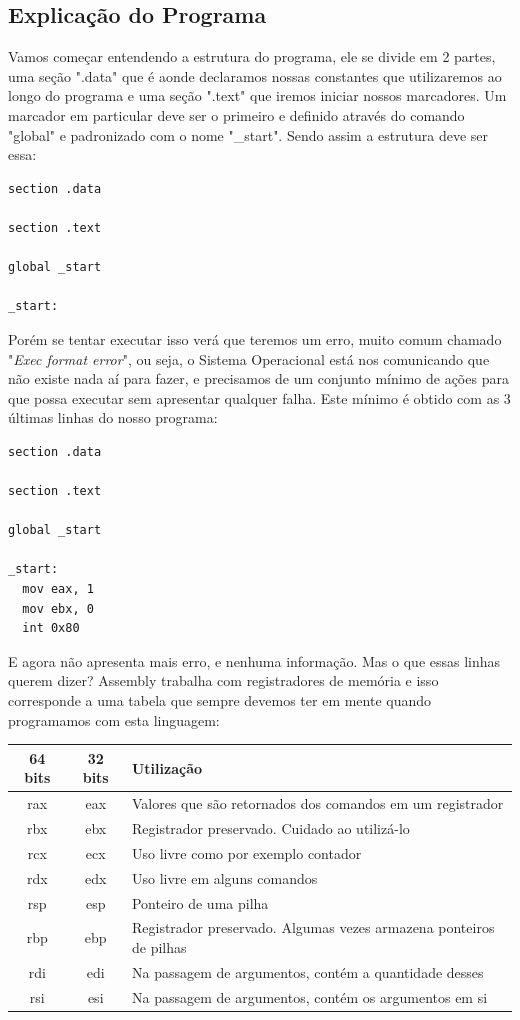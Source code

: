 \subsection{Explicação do Programa}

Vamos começar entendendo a estrutura do programa, ele se divide em 2 partes, uma seção ".data" que é aonde declaramos nossas constantes que utilizaremos ao longo do programa e uma seção ".text" que iremos iniciar nossos marcadores. Um marcador em particular deve ser o primeiro e definido através do comando "global" e padronizado com o nome "\_start". Sendo assim a estrutura deve ser essa:
\begin{lstlisting}[]
section .data
	
section .text
	
global _start
	
_start:
\end{lstlisting}

Porém se tentar executar isso verá que teremos um erro, muito comum chamado "\textit{Exec format error}", ou seja, o Sistema Operacional está nos comunicando que não existe nada aí para fazer, e precisamos de um conjunto mínimo de ações para que possa executar sem apresentar qualquer falha. Este mínimo é obtido com as 3 últimas linhas do nosso programa:
\begin{lstlisting}[]
section .data

section .text

global _start

_start:
  mov eax, 1
  mov ebx, 0
  int 0x80
\end{lstlisting}

E agora não apresenta mais erro, e nenhuma informação. Mas o que essas linhas querem dizer? Assembly trabalha com registradores de memória e isso corresponde a uma tabela que sempre devemos ter em mente quando programamos com esta linguagem:

\begin{table}[H]
	\centering 
	\begin{tabular}{c | c | l }
		\textbf{64 bits} & \textbf{32 bits} & \textbf{Utilização} \\ \hline
		rax & eax & Valores que são retornados dos comandos em um registrador \\
		rbx & ebx & Registrador preservado. Cuidado ao utilizá-lo \\
		rcx & ecx & Uso livre como por exemplo contador \\
		rdx & edx & Uso livre em alguns comandos \\
		rsp & esp & Ponteiro de uma pilha \\
		rbp & ebp & Registrador preservado. Algumas vezes armazena ponteiros de pilhas \\
		rdi & edi & Na passagem de argumentos, contém a quantidade desses \\
		rsi & esi & Na passagem de argumentos, contém os argumentos em si \\
	\end{tabular}
\end{table}

